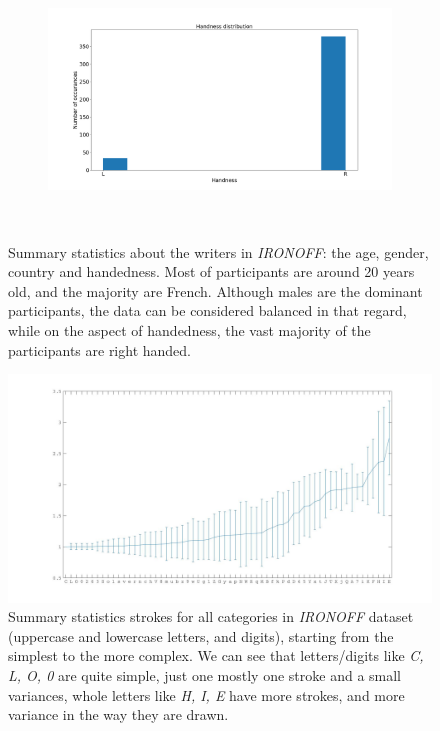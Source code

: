 \begin{figure}
\begin{subfigure}{0.45\textwidth}
    \end{subfigure}
    ~
    \begin{subfigure}{0.45\textwidth}
        \includegraphics[scale=0.25]{images/dataset/handness_dist.png}
    \end{subfigure}
    ~
    \caption{Summary statistics about the writers in \textit{IRONOFF}: the age, gender, country and handedness. Most of participants are around 20 years old, and the majority are French. Although males are the dominant participants, the data can be considered balanced in that regard, while on the aspect of handedness, the vast majority of the participants are right handed.}
    \label{fig:ironoff_basic_stats}
\end{figure}

\begin{figure}
    \centering
    \includegraphics[scale=0.32]{images/dataset/ironoff_strokes.jpg}
    \caption{Summary statistics strokes for all categories in \textit{IRONOFF} dataset (uppercase and lowercase letters, and digits), starting from the simplest to the more complex. We can see that letters/digits like \textit{C, L, O, 0} are quite simple, just one mostly one stroke and a small variances, whole letters like \textit{H, I, E} have more strokes, and more variance in the way they are drawn.}
    \label{fig:ironoff_strokes}
\end{figure}

